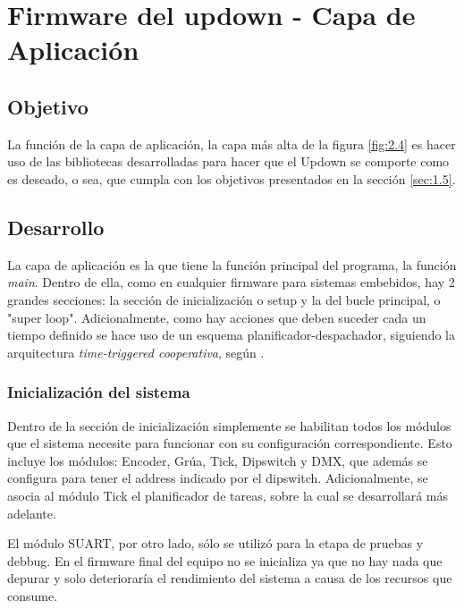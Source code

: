 
\section{Firmware del updown - Capa de Aplicación} \label{sec:\thesection}

\subsection{Objetivo}
La función de la capa de aplicación, la capa más alta de la figura \ref{fig:2.4} es hacer uso de las bibliotecas desarrolladas para hacer que el Updown se comporte como es deseado, o sea, que cumpla con los objetivos presentados en la sección \ref{sec:1.5}.

\subsection{Desarrollo}
La capa de aplicación es la que tiene la función principal del programa, la función \textit{main}. Dentro de ella, como en cualquier firmware para sistemas embebidos, hay 2 grandes secciones: la sección de inicialización o setup y la del bucle principal, o "super loop". Adicionalmente, como hay acciones que deben suceder cada un tiempo definido se hace uso de un esquema planificador-despachador, siguiendo la arquitectura \textit{time-triggered cooperativa}, según \cite{sec3_6_2}.

\subsubsection{Inicialización del sistema}

Dentro de la sección de inicialización simplemente se habilitan todos los módulos que el sistema necesite para funcionar con su configuración correspondiente. Esto incluye los módulos: Encoder, Grúa, Tick, Dipswitch y DMX, que además se configura para tener el address indicado por el dipswitch. Adicionalmente, se asocia al módulo Tick el planificador de tareas, sobre la cual se desarrollará más adelante.

El módulo SUART, por otro lado, sólo se utilizó para la etapa de pruebas y debbug. En el firmware final del equipo no se inicializa ya que no hay nada que depurar y solo deterioraría el rendimiento del sistema a causa de los recursos que consume. 

